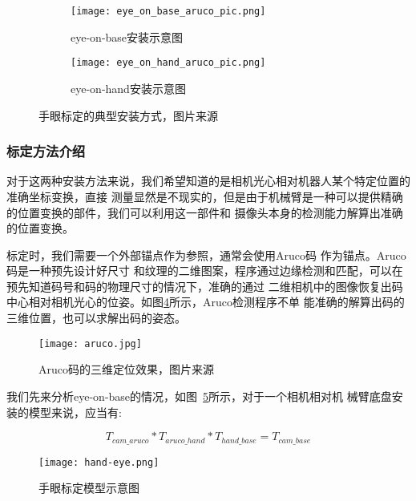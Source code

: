 \begin{figure}
\centering
\begin{subfigure}{.5\textwidth}
  \centering
  \texttt{[image: eye\_on\_base\_aruco\_pic.png]}
  \caption{eye-on-base安装示意图}
  \label{fig:eye_on_base}
\end{subfigure}%
\begin{subfigure}{.5\textwidth}
  \centering
  \texttt{[image: eye\_on\_hand\_aruco\_pic.png]}
  \caption{eye-on-hand安装示意图}
  \label{fig:eye_on_hand}
\end{subfigure}
\caption{手眼标定的典型安装方式，图片来源\cite{easy_handeye}}
\end{figure}


\subsubsection{标定方法介绍}

对于这两种安装方法来说，我们希望知道的是相机光心相对机器人某个特定位置的准确坐标变换，直接
测量显然是不现实的，但是由于机械臂是一种可以提供精确的位置变换的部件，我们可以利用这一部件和
摄像头本身的检测能力解算出准确的位置变换。

标定时，我们需要一个外部锚点作为参照，通常会使用Aruco码\cite{garrido2014automatic}
作为锚点。Aruco码是一种预先设计好尺寸
和纹理的二维图案，程序通过边缘检测和匹配，可以在预先知道码号和码的物理尺寸的情况下，准确的通过
二维相机中的图像恢复出码中心相对相机光心的位姿。如图\ref{fig:aruco}所示，Aruco检测程序不单
能准确的解算出码的三维位置，也可以求解出码的姿态。

\begin{figure}[h] %
  \centering
  \texttt{[image: aruco.jpg]}
  \caption{Aruco码的三维定位效果，图片来源\cite{aruco}}
  \label{fig:aruco}
\end{figure}

我们先来分析eye-on-base的情况，如图~\ref{fig:hand_eye}所示，对于一个相机相对机
械臂底盘安装的模型来说，应当有:

\begin{equation}
  T_{cam\_aruco} * T_{aruco\_hand} * T_{hand\_base} = T_{cam\_base}
\end{equation}

\begin{figure}[h] %
  \centering
  \texttt{[image: hand-eye.png]}
  \caption{手眼标定模型示意图}
  \label{fig:hand_eye}
\end{figure}

